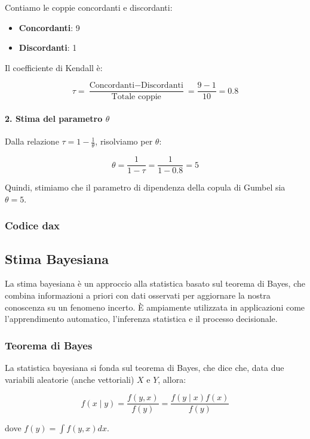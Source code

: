 \documentclass[%
	corpo=11pt,
    twoside,
    stile=classica,
    oldstyle,
    tipotesi=custom,
    greek,
    evenboxes,
]{toptesi}
\begin{document}
Contiamo le coppie concordanti e discordanti:

\begin{itemize}
	\item \textbf{Concordanti}: 9
	\item \textbf{Discordanti}: 1
\end{itemize}

Il coefficiente di Kendall è:

\[
\tau = \frac{\text{Concordanti} - \text{Discordanti}}{\text{Totale coppie}} = \frac{9 - 1}{10} = 0.8
\]

\paragraph{2. Stima del parametro \( \theta \)}

Dalla relazione \( \tau = 1 - \frac{1}{\theta} \), risolviamo per \( \theta \):

\[
\theta = \frac{1}{1 - \tau} = \frac{1}{1 - 0.8} = 5
\]

Quindi, stimiamo che il parametro di dipendenza della copula di Gumbel sia \( \theta = 5 \).

\subsubsection{Codice dax}

\subsection{Stima Bayesiana}

La stima bayesiana è un approccio alla statistica basato sul teorema di Bayes, che combina informazioni a priori con dati osservati per aggiornare la nostra conoscenza su un fenomeno incerto. È ampiamente utilizzata in applicazioni come l’apprendimento automatico, l’inferenza statistica e il processo decisionale.

\subsubsection{Teorema di Bayes}

La statistica bayesiana si fonda sul teorema di Bayes, che dice che, data due variabili aleatorie (anche vettoriali) \( X \) e \( Y \), allora:

\[
f(x \mid y) = \frac{f(y, x)}{f(y)} = \frac{f(y \mid x) f(x)}{f(y)}
\]

dove \( f(y) = \int f(y, x)dx \). 
\end{document}
